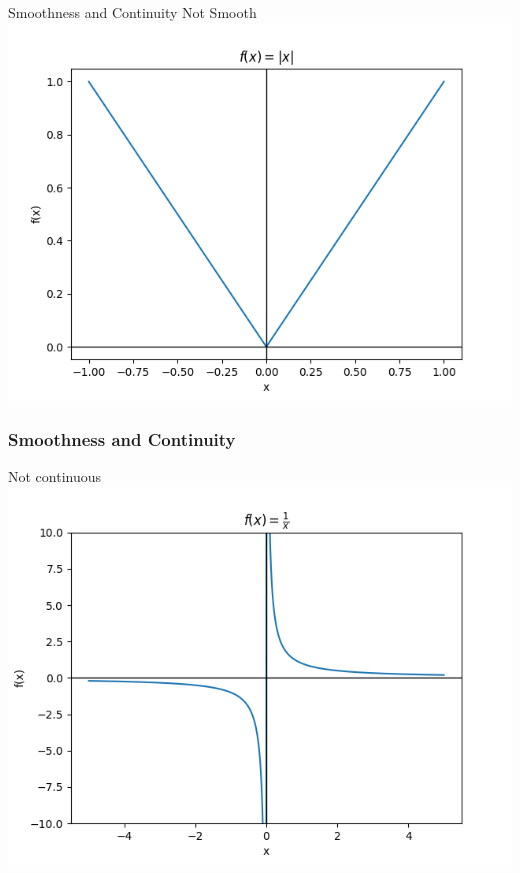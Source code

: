 \documentclass{beamer}
\begin{document}
\begin{frame}{Smoothness and Continuity}
    Not Smooth\\
    \includegraphics[scale=0.5]{figs/fig_2.png}
\end{frame}

\begin{frame}
    \frametitle{Smoothness and Continuity}

    Not continuous\\
    \includegraphics[scale=0.5]{figs/fig_3.png}

\end{frame}
\end{document}

